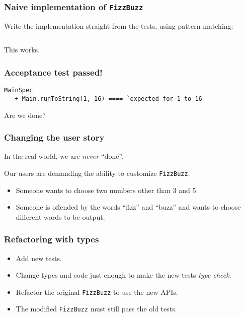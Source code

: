 \begin{frame}[fragile]
  \frametitle{Naive implementation of \texttt{FizzBuzz}}

  Write the implementation straight from the tests, using pattern matching:
  \inputminted{scala}{FizzBuzz2.scala}

  This works.
\end{frame}

\begin{frame}[fragile]
  \frametitle{Acceptance test passed!}

  \begin{verbatim}
MainSpec
   + Main.runToString(1, 16) ==== `expected for 1 to 16
  \end{verbatim}

  Are we done?
\end{frame}

\begin{frame}
  \frametitle{Changing the user story}

  In the real world, we are \emph{never} ``done''.

  Our users are demanding the ability to customize \texttt{FizzBuzz}.

  \begin{itemize}
  \item Someone wants to choose two numbers other than 3 and 5.
  \item Someone is offended by the words ``fizz'' and ``buzz'' and wants to choose different words to be output.
  \end{itemize}
\end{frame}

\begin{frame}
  \frametitle{Refactoring with types}

  \begin{itemize}
  \item Add new tests.
  \item Change types and code just enough to make the new tests \emph{type check}.
  \item Refactor the original \texttt{FizzBuzz} to use the new APIs.
  \item The modified \texttt{FizzBuzz} must still pass the old tests.
  \end{itemize}
\end{frame}

%

